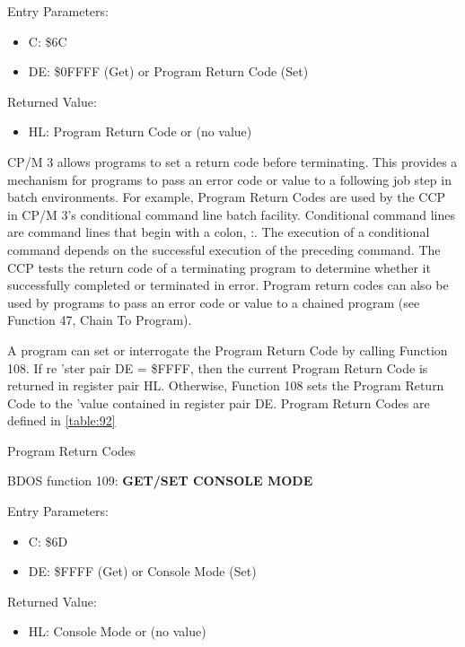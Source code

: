 Entry Parameters:
\begin{itemize}
\item[] C: \$6C
\item[] DE: \$0FFFF (Get) or Program Return Code (Set)
\end{itemize}

Returned Value:
\begin{itemize}
\item[] HL: Program Return Code or (no value)
\end{itemize}

CP/M 3 allows programs to set a return code before terminating. This
provides a mechanism for programs to pass an error code or value to a
following job step in batch environments. For example, Program Return
Codes are used by the CCP in CP/M 3's conditional command line batch
facility. Conditional command lines are command lines that begin with
a colon, :. The execution of a conditional command depends on the
successful execution of the preceding command. The CCP tests the
return code of a terminating program to determine whether it
successfully completed or terminated in error. Program return codes
can also be used by programs to pass an error code or value to a
chained program (see Function 47, Chain To Program).

A program can set or interrogate the Program Return Code by calling
Function 108. If re 'ster pair DE = \$FFFF, then the current Program
Return Code is returned in register pair HL. Otherwise, Function 108
sets the Program Return Code to the 'value contained in register pair
DE. Program Return Codes are defined in \ref{table:92}

\begin{table}[h]\centering
  \caption{Program Return Codes}
  \label{table:92}
\end{table}

BDOS function 109: \textbf{GET/SET CONSOLE MODE}

Entry Parameters:
\begin{itemize}
\item[] C: \$6D
\item[] DE: \$FFFF (Get) or Console Mode (Set)
\end{itemize}

Returned Value:
\begin{itemize}
\item[] HL: Console Mode or (no value)
\end{itemize}

